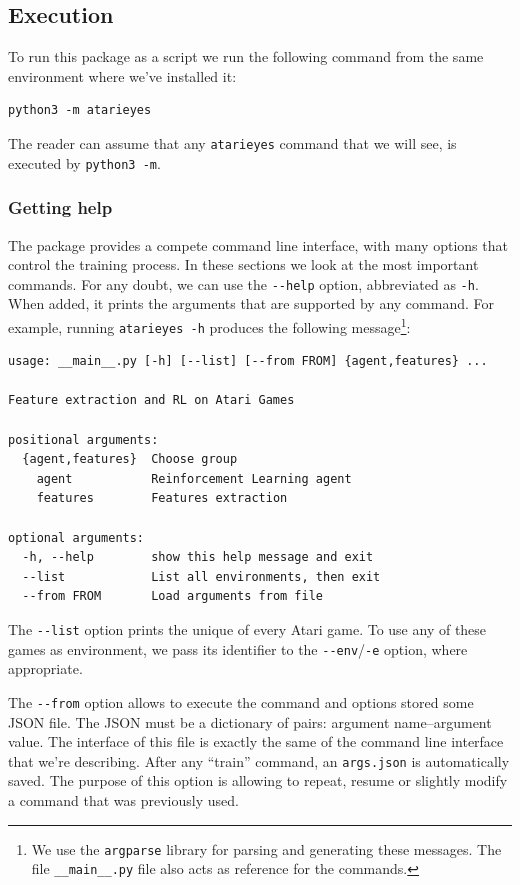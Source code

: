 \subsection{Execution}

To run this package as a script we run the following command from the same
environment where we've installed it:
\begin{lstlisting}[style=bash]
python3 -m atarieyes
\end{lstlisting}
The reader can assume that any \texttt{atarieyes} command that we will see, is
executed by \lstinline[style=inlinesh]|python3 -m|.

\subsubsection*{Getting help}

The package provides a compete command line interface, with many options that
control the training process. In these sections we look at the most important
commands. For any doubt, we can use the \verb|--help| option, abbreviated
as \verb|-h|. When added, it prints the arguments that are supported by any
command. For example, running \lstinline[style=inlinesh]{atarieyes -h}
produces the following message\footnote{We use the
\texttt{argparse} library for parsing and generating these messages. The file
\texttt{\_\_main\_\_.py} file also acts as reference for the commands.}:
\begin{lstlisting}
usage: __main__.py [-h] [--list] [--from FROM] {agent,features} ...

Feature extraction and RL on Atari Games

positional arguments:
  {agent,features}  Choose group
    agent           Reinforcement Learning agent
    features        Features extraction

optional arguments:
  -h, --help        show this help message and exit
  --list            List all environments, then exit
  --from FROM       Load arguments from file
\end{lstlisting}

The \verb|--list| option prints the unique of every Atari game. To use any of
these games as environment, we pass its identifier to the
\verb|--env|/\texttt{-e} option, where appropriate.

The \verb|--from| option allows to execute the command and options stored some
JSON file. The JSON must be a dictionary of pairs: argument name--argument
value. The interface of this file is exactly the same of the command line
interface that we're describing. After any ``train'' command, an
\verb|args.json| is automatically saved. The purpose of this option is
allowing to repeat, resume or slightly modify a command that was previously
used.

